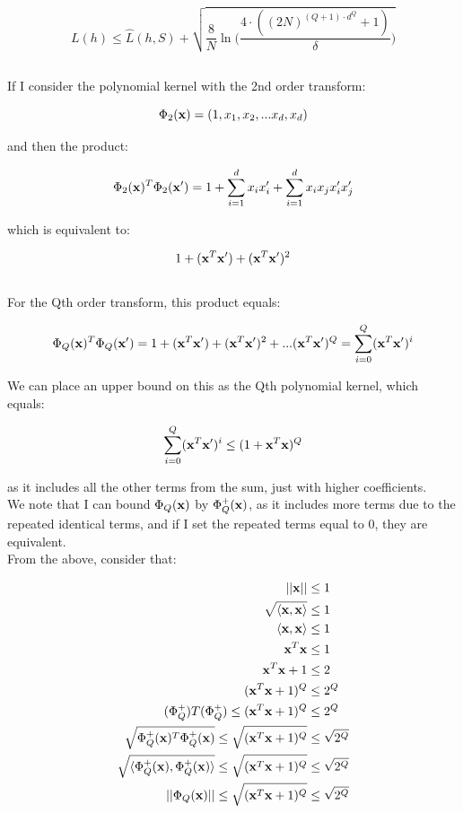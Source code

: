 \documentclass{scrartcl}
\begin{document}
\[
    L(h) \leq \hat{L} (h, S) + \sqrt { \frac {8} {N} \ln \bigg( \frac {4 \cdot ( (2N)^{(Q + 1) \cdot d^Q} + 1) } {\delta} \bigg) }
\]

\subsection{}

If I consider the polynomial kernel with the 2nd order transform:

\[ \Phi_2({\mathbf x}) = (1, x_1, x_2, ... x_d, x_d) \]

and then the product:

\[ \Phi_2({\mathbf x})^T \Phi_2({\mathbf x}') = 1 + \sum^d_{i=1} x_ix_i' + \sum^d_{i=1} x_ix_jx_i'x_j' \]

which is equivalent to:

\[ 1 + ({\mathbf x}^T {\mathbf x}') + ({\mathbf x}^T {\mathbf x}')^2 \] \cite[p. 8-34]{abu} \\

For the Qth order transform, this product equals:

\[ \Phi_Q({\mathbf x})^T\Phi_Q({\mathbf x}') = 1 + ({\mathbf x}^T {\mathbf x}') + ({\mathbf x}^T {\mathbf x}')^2 + ... ({\mathbf x}^T {\mathbf x}')^Q \\
= \sum_{i=0}^{Q} ({\mathbf x}^T {\mathbf x}')^i
\]

We can place an upper bound on this as the Qth polynomial kernel, which equals:

\[ \sum_{i=0}^{Q} ({\mathbf x}^T {\mathbf x}')^i \leq (1 + {\mathbf x}^T {\mathbf x})^Q \]

as it includes all the other terms from the sum, just with higher coefficients.\\

We note that I can bound $\Phi_Q({\mathbf x})$ by $\Phi^+_Q({\mathbf x})$, as it includes more terms due to the repeated identical terms, and if I set the repeated terms equal to 0, they are equivalent. \\

From the above, consider that:

\begin{align*}
    || {\mathbf x} || &\leq 1 \\
    \sqrt{ \langle {\mathbf x}, {\mathbf x} \rangle } &\leq 1 \\
    \langle {\mathbf x}, {\mathbf x} \rangle &\leq 1 \\
    {\mathbf x}^T {\mathbf x} &\leq 1 \\
    {\mathbf x}^T {\mathbf x} + 1 &\leq 2 \\
    ({\mathbf x}^T {\mathbf x} + 1)^Q &\leq 2^Q \\
    (\Phi_Q^+)T(\Phi_Q^+) \leq ({\mathbf x}^T {\mathbf x} + 1)^Q &\leq 2^Q \\
    \sqrt{\Phi_Q^+({\mathbf x})^T\Phi_Q^+({\mathbf x})} \leq \sqrt{ ({\mathbf x}^T {\mathbf x} + 1)^Q} &\leq \sqrt{2^Q} \\
    \sqrt{\langle \Phi_Q^+({\mathbf x}), \Phi_Q^+({\mathbf x}) \rangle} \leq \sqrt{ ({\mathbf x}^T {\mathbf x} + 1)^Q} &\leq \sqrt{2^Q} \\
    || \Phi_Q({\mathbf x}) || \leq \sqrt{ ({\mathbf x}^T {\mathbf x} + 1)^Q} &\leq \sqrt{2^Q} \\
\end{align*}
\end{document}
